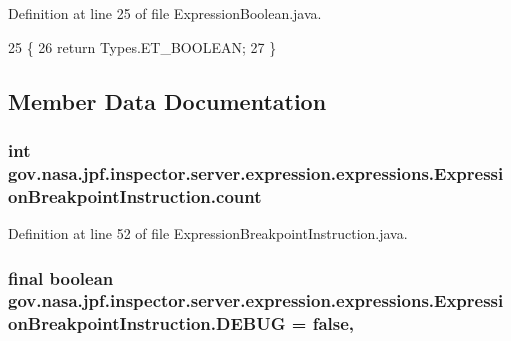 Definition at line 25 of file Expression\+Boolean.\+java.


\begin{DoxyCode}
25                           \{
26     \textcolor{keywordflow}{return} Types.ET\_BOOLEAN;
27   \}
\end{DoxyCode}


\subsection{Member Data Documentation}
\subsubsection[{\texorpdfstring{count}{count}}]{\setlength{\rightskip}{0pt plus 5cm}int gov.\+nasa.\+jpf.\+inspector.\+server.\+expression.\+expressions.\+Expression\+Breakpoint\+Instruction.\+count\hspace{0.3cm}{\ttfamily [private]}}\hypertarget{classgov_1_1nasa_1_1jpf_1_1inspector_1_1server_1_1expression_1_1expressions_1_1_expression_breakpoint_instruction_a5f34ea83fbef51ac62d0853ab034f473}{}\label{classgov_1_1nasa_1_1jpf_1_1inspector_1_1server_1_1expression_1_1expressions_1_1_expression_breakpoint_instruction_a5f34ea83fbef51ac62d0853ab034f473}


Definition at line 52 of file Expression\+Breakpoint\+Instruction.\+java.

\subsubsection[{\texorpdfstring{D\+E\+B\+UG}{DEBUG}}]{\setlength{\rightskip}{0pt plus 5cm}final boolean gov.\+nasa.\+jpf.\+inspector.\+server.\+expression.\+expressions.\+Expression\+Breakpoint\+Instruction.\+D\+E\+B\+UG = false\hspace{0.3cm}{\ttfamily [static]}, {\ttfamily [private]}}\hypertarget{classgov_1_1nasa_1_1jpf_1_1inspector_1_1server_1_1expression_1_1expressions_1_1_expression_breakpoint_instruction_ac93551d7a34f93820e1759d2f0761c84}{}\label{classgov_1_1nasa_1_1jpf_1_1inspector_1_1server_1_1expression_1_1expressions_1_1_expression_breakpoint_instruction_ac93551d7a34f93820e1759d2f0761c84}


